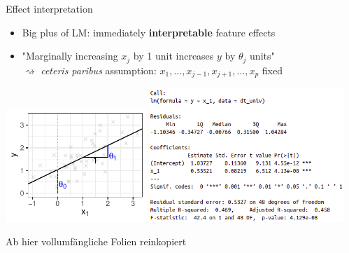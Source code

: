 \documentclass[11pt,compress,t,notes=noshow, xcolor=table]{beamer}
\begin{document}
\begin{vbframe}{Effect interpretation}

\begin{itemize}
    \item Big plus of LM: immediately \textbf{interpretable} feature effects
    \item "Marginally increasing $x_j$ by 1 unit increases $y$ by $\theta_j$ 
    units" \\
    $\rightsquigarrow$ \textit{ceteris paribus} assumption: 
    $x_1, \dots, x_{j - 1}, x_{j + 1}, \dots, x_p$ fixed
\end{itemize}

\vfill
\includegraphics[width=0.4\textwidth]{figure/reg_l2_basic_lm_interpreted.pdf} 
\hfill
\includegraphics[width=0.55\textwidth]{figure_man/lm_summary} 

\end{vbframe}



\begin{vbframe}{Ab hier vollumfängliche Folien reinkopiert}

\end{vbframe}

\end{document}
